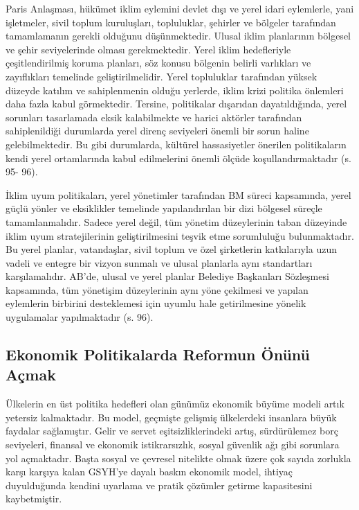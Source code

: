 \documentclass[
]{book}
\begin{document}
Paris Anlaşması, hükümet iklim eylemini devlet dışı ve yerel idari eylemlerle, yani işletmeler, sivil toplum kuruluşları, topluluklar, şehirler ve bölgeler tarafından tamamlamanın gerekli olduğunu düşünmektedir. Ulusal iklim planlarının bölgesel ve şehir seviyelerinde olması gerekmektedir. Yerel iklim hedefleriyle çeşitlendirilmiş koruma planları, söz konusu bölgenin belirli varlıkları ve zayıflıkları temelinde geliştirilmelidir. Yerel topluluklar tarafından yüksek düzeyde katılım ve sahiplenmenin olduğu yerlerde, iklim krizi politika önlemleri daha fazla kabul görmektedir. Tersine, politikalar dışarıdan dayatıldığında, yerel sorunları tasarlamada eksik kalabilmekte ve harici aktörler tarafından sahiplenildiği durumlarda yerel direnç seviyeleri önemli bir sorun haline gelebilmektedir. Bu gibi durumlarda, kültürel hassasiyetler önerilen politikaların kendi yerel ortamlarında kabul edilmelerini önemli ölçüde koşullandırmaktadır (s. 95- 96). \citep{ponthieu2019climate}

İklim uyum politikaları, yerel yönetimler tarafından BM süreci kapsamında, yerel güçlü yönler ve eksiklikler temelinde yapılandırılan bir dizi bölgesel süreçle tamamlanmalıdır. Sadece yerel değil, tüm yönetim düzeylerinin taban düzeyinde iklim uyum stratejilerinin geliştirilmesini teşvik etme sorumluluğu bulunmaktadır. Bu yerel planlar, vatandaşlar, sivil toplum ve özel şirketlerin katkılarıyla uzun vadeli ve entegre bir vizyon sunmalı ve ulusal planlarla aynı standartları karşılamalıdır. AB'de, ulusal ve yerel planlar Belediye Başkanları Sözleşmesi kapsamında, tüm yönetişim düzeylerinin aynı yöne çekilmesi ve yapılan eylemlerin birbirini desteklemesi için uyumlu hale getirilmesine yönelik uygulamalar yapılmaktadır (s. 96). \citep{ponthieu2019climate}

\hypertarget{ekonomik-politikalarda-reformun-uxf6nuxfcnuxfc-auxe7mak}{%
\subsection{Ekonomik Politikalarda Reformun Önünü Açmak}\label{ekonomik-politikalarda-reformun-uxf6nuxfcnuxfc-auxe7mak}}

Ülkelerin en üst politika hedefleri olan günümüz ekonomik büyüme modeli artık yetersiz kalmaktadır. Bu model, geçmişte gelişmiş ülkelerdeki insanlara büyük faydalar sağlamıştır. Gelir ve servet eşitsizliklerindeki artış, sürdürülemez borç seviyeleri, finansal ve ekonomik istikrarsızlık, sosyal güvenlik ağı gibi sorunlara yol açmaktadır. Başta sosyal ve çevresel nitelikte olmak üzere çok sayıda zorlukla karşı karşıya kalan GSYH'ye dayalı baskın ekonomik model, ihtiyaç duyulduğunda kendini uyarlama ve pratik çözümler getirme kapasitesini kaybetmiştir.
\end{document}

